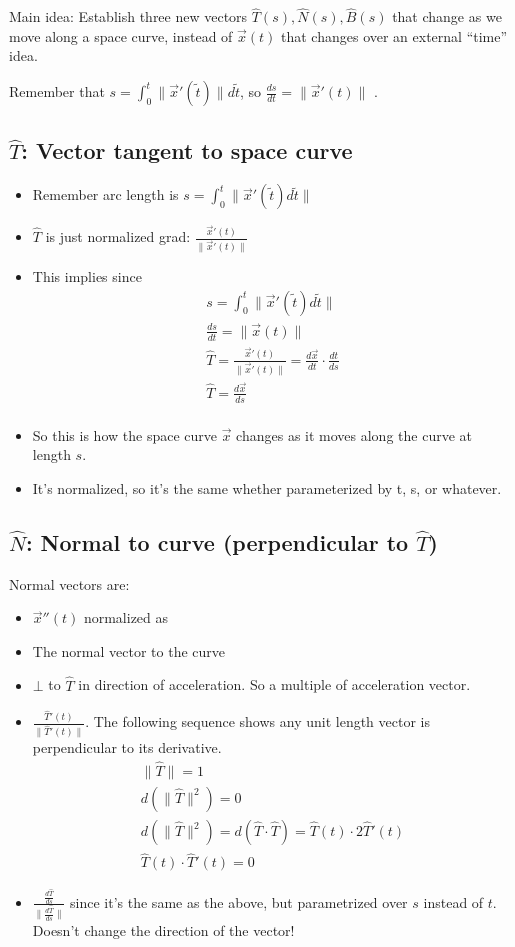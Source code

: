 \documentclass[11pt, oneside]{article}   	%
\begin{document}
Main idea: Establish three new vectors $\hat{T}(s), \hat{N}(s), \hat{B}(s)$ that change as we move along a space curve, instead of $\vec{x}(t)$ that changes over an external ``time'' idea.

Remember that  $s = \int_0^t \| \vec{x}'(\tilde{t}) \| d\tilde{t}$, so $\frac{ds}{dt} = \| \vec{x}'(t)\|$ .

\subsection{$\hat{T}$: Vector tangent to space curve}
\begin{itemize}
\item Remember arc length is $s = \int_0^t \| \vec{x}'(\tilde{t})d\tilde{t} \|$
\item $\hat{T}$ is just normalized grad: $\frac{\vec{x}'(t)}{\|\vec{x}'(t)\|}$
\item This implies  since 
\begin{align}
s = \int_0^t \| \vec{x}'(\tilde{t})d\tilde{t} \| \\
\frac{ds}{dt} = \| \vec{x}(t) \| \\
\hat{T} = \frac{\vec{x}'(t)}{\|\vec{x}'(t)\|}  = \frac{d\vec{x}}{dt} \cdot \frac{dt}{ds} \\
\hat{T} = \frac{d\vec{x}}{ds} \\
\end{align}
\item So this is how the space curve $\vec{x}$ changes as it moves along the curve at length $s$.
\item It's normalized, so it's the same whether parameterized by t, s, or whatever.
\end{itemize}


\subsection{$\hat{N}$: Normal to curve (perpendicular to $\hat{T}$)}
Normal vectors are:
\begin{itemize}
\item $\vec{x}''(t)$ normalized as 
\item The normal vector to the curve
\item $\bot$ to $\hat{T}$ in direction of acceleration.  So a multiple of acceleration vector.
\item $\frac{\hat{T}'(t)} { \| \hat{T}'(t) \|}$.  The following sequence shows any unit length vector is perpendicular to its derivative.
\begin{align}
\| \hat{T} \| = 1 \\
d(\| \hat{T} \|^2) = 0 \\
d(\| \hat{T} \|^2) = d(\hat{T} \cdot \hat{T}) = \hat{T}(t) \cdot 2\hat{T}'(t) \\
\hat{T}(t) \cdot \hat{T}'(t)  = 0
\end{align}
\item $\frac{ \frac{d\hat{T}}{ds}  }  { \| \frac{d\hat{T}}{ds}  \| }$ since it's the same as the above, but parametrized over $s$ instead of $t$.  Doesn't change the direction of the vector!
\end{itemize}
\end{document}
